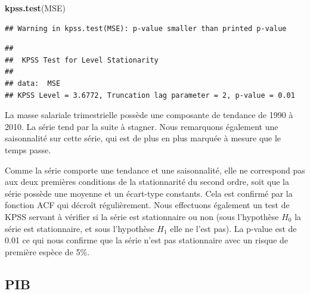 \documentclass[11pt,]{article}
\newenvironment{Shaded}{\begin{snugshade}}{\end{snugshade}}
\newcommand{\KeywordTok}[1]{\textcolor[rgb]{0.13,0.29,0.53}{\textbf{{#1}}}}
\newcommand{\DataTypeTok}[1]{\textcolor[rgb]{0.13,0.29,0.53}{{#1}}}
\newcommand{\DecValTok}[1]{\textcolor[rgb]{0.00,0.00,0.81}{{#1}}}
\newcommand{\StringTok}[1]{\textcolor[rgb]{0.31,0.60,0.02}{{#1}}}
\newcommand{\NormalTok}[1]{{#1}}
\begin{document}
\begin{Shaded}
\begin{Highlighting}[]
  \KeywordTok{kpss.test}\NormalTok{(MSE)}
\end{Highlighting}
\end{Shaded}

\begin{verbatim}
## Warning in kpss.test(MSE): p-value smaller than printed p-value
\end{verbatim}

\begin{verbatim}
## 
##  KPSS Test for Level Stationarity
## 
## data:  MSE
## KPSS Level = 3.6772, Truncation lag parameter = 2, p-value = 0.01
\end{verbatim}

La masse salariale trimestrielle possède une composante de tendance de
1990 à 2010. La série tend par la suite à stagner. Nous remarquons
également une saisonnalité sur cette série, qui est de plus en plus
marquée à mesure que le temps passe.

Comme la série comporte une tendance et une saisonnalité, elle ne
correspond pas aux deux premières conditions de la stationnarité du
second ordre, soit que la série possède une moyenne et un écart-type
constants. Cela est confirmé par la fonction ACF qui décroît
régulièrement. Nous effectuons également un test de KPSS servant à
vérifier si la série est stationnaire ou non (sous l'hypothèse \(H_{0}\)
la série est stationnaire, et sous l'hypothèse \(H_{1}\) elle ne l'est
pas). La p-value est de 0.01 ce qui nous confirme que la série n'est pas
stationnaire avec un risque de première espèce de 5\%.

\subsection{PIB}\label{pib}

\begin{Shaded}
\end{Shaded}
\end{document}
